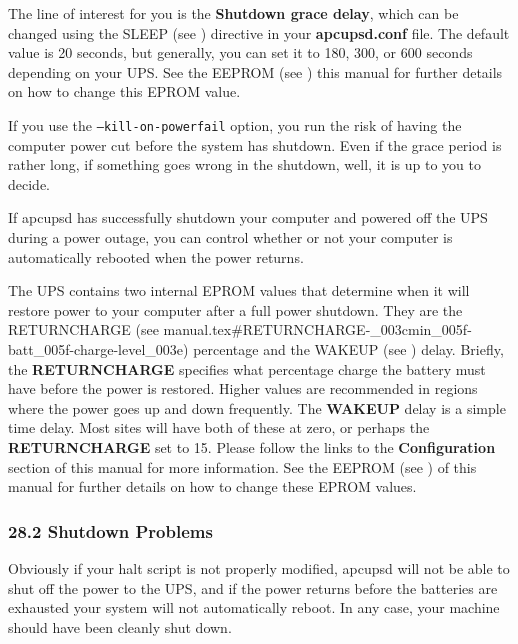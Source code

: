 The line of interest for you is the {\bf Shutdown grace delay}, which can be
changed using the SLEEP (see 
) directive in your
{\bf apcupsd.conf} file. The default value is 20 seconds, but generally, you
can set it to 180, 300, or 600 seconds depending on your UPS. See the EEPROM
(see 
) this
manual for further details on how to change this EPROM value.  

If you use the {\tt --kill-on-powerfail} option, you run the risk of having
the computer power cut before the system has shutdown. Even if the grace
period is rather long, if something goes wrong in the shutdown, well, it is up
to you to decide.  

If apcupsd has successfully shutdown your computer and powered off the UPS
during a power outage, you can control whether or not your computer is
automatically rebooted when the power returns.  

The UPS contains two internal EPROM values that determine when it will restore
power to your computer after a full power shutdown. They are the RETURNCHARGE
(see 
{manual.tex#RETURNCHARGE-_003cmin_005f-batt_005f-charge-level_003e})
percentage and the WAKEUP (see 
) delay. Briefly, the
{\bf RETURNCHARGE} specifies what percentage charge the battery must have
before the power is restored. Higher values are recommended in regions where
the power goes up and down frequently. The {\bf WAKEUP} delay is a simple time
delay. Most sites will have both of these at zero, or perhaps the {\bf
RETURNCHARGE} set to 15. Please follow the links to the {\bf Configuration}
section of this manual for more information.  See the EEPROM (see 
) of this
manual for further details on how to change these EPROM values. 

\label{Shutdown-Problems}

\subsubsection*{28.2 Shutdown Problems}

Obviously if your halt script is not properly modified, apcupsd will not be
able to shut off the power to the UPS, and if the power returns before the
batteries are exhausted your system will not automatically reboot. In any
case, your machine should have been cleanly shut down. 

